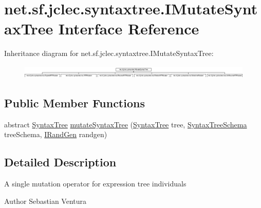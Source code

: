 \hypertarget{interfacenet_1_1sf_1_1jclec_1_1syntaxtree_1_1_i_mutate_syntax_tree}{\section{net.\-sf.\-jclec.\-syntaxtree.\-I\-Mutate\-Syntax\-Tree Interface Reference}
\label{interfacenet_1_1sf_1_1jclec_1_1syntaxtree_1_1_i_mutate_syntax_tree}
}
Inheritance diagram for net.\-sf.\-jclec.\-syntaxtree.\-I\-Mutate\-Syntax\-Tree\-:\begin{figure}[H]
\begin{center}
\leavevmode
\includegraphics[height=0.639269cm]{interfacenet_1_1sf_1_1jclec_1_1syntaxtree_1_1_i_mutate_syntax_tree}
\end{center}
\end{figure}
\subsection*{Public Member Functions}
\begin{DoxyCompactItemize}
\item 
abstract \hyperlink{classnet_1_1sf_1_1jclec_1_1syntaxtree_1_1_syntax_tree}{Syntax\-Tree} \hyperlink{interfacenet_1_1sf_1_1jclec_1_1syntaxtree_1_1_i_mutate_syntax_tree_ac458c63a51084cb0614e5afc5e523625}{mutate\-Syntax\-Tree} (\hyperlink{classnet_1_1sf_1_1jclec_1_1syntaxtree_1_1_syntax_tree}{Syntax\-Tree} tree, \hyperlink{classnet_1_1sf_1_1jclec_1_1syntaxtree_1_1_syntax_tree_schema}{Syntax\-Tree\-Schema} tree\-Schema, \hyperlink{interfacenet_1_1sf_1_1jclec_1_1util_1_1random_1_1_i_rand_gen}{I\-Rand\-Gen} randgen)
\end{DoxyCompactItemize}


\subsection{Detailed Description}
A single mutation operator for expression tree individuals

\begin{DoxyAuthor}{Author}
Sebastian Ventura 
\end{DoxyAuthor}


